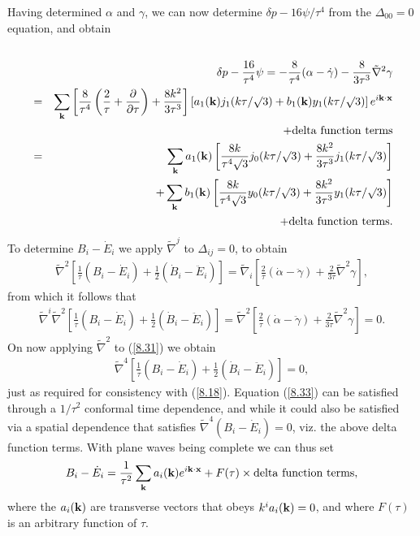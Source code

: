 Having determined $\alpha$ and $\gamma$, we can now determine $\delta p-16\psi/\tau^4$ from the $\Delta_{00}=0$ equation, and obtain
%
\begin{eqnarray}
\nonumber\\
&&\delta p -\frac{16}{\tau^4}\psi=-\frac{8}{\tau^4}(\alpha-\dot{\gamma})-\frac{8}{3\tau^3}\tilde{\nabla}^2\gamma
\nonumber\\
&=&\sum_{\bf k}\left[\frac{8}{\tau^4}\left(\frac{2}{\tau}+\frac{\partial}{\partial \tau}\right)
+\frac{8k^2}{3\tau^3}\right]\left[a_1({\bf k})j_1(k\tau/\surd{3})+b_1({\bf k})y_1(k\tau/\surd{3})\right]e^{i{\bf k}\cdot{\bf x}}
\nonumber\\
&& + {\rm delta~function~terms}
\nonumber\\
&=&\sum_{\bf k}a_1({\bf k})\left[\frac{8k}{\tau^4\surd{3}}j_0(k\tau/\surd{3})+\frac{8k^2}{3\tau^3}j_1(k\tau/\surd{3})\right]
\nonumber\\
&&+\sum_{\bf k}b_1({\bf k})\left[\frac{8k}{\tau^4\surd{3}}y_0(k\tau/\surd{3})+\frac{8k^2}{3\tau^3}y_1(k\tau/\surd{3})\right]
\nonumber\\
&&+ {\rm delta~function~terms}.
\label{8.30}
\end{eqnarray}
%
To determine $B_i-\dot{E}_i$ we apply $\tilde{\nabla}^j$ to $\Delta_{ij}=0$, to obtain
%
\begin{eqnarray}
\tilde{\nabla}^2\left[\frac{1}{\tau}(B_i-\dot{E}_i)+\frac{1}{2}(\dot{B}_i-\ddot{E}_i)\right]=\tilde{\nabla}_i\left[\frac{2}{\tau}(\dot{\alpha}-\ddot{\gamma})+\frac{2}{3\tau}\tilde{\nabla}^2\gamma\right],
\label{8.31}
\end{eqnarray}
%
from which it follows that
%
\begin{eqnarray}
\tilde{\nabla}^i\tilde{\nabla}^2\left[\frac{1}{\tau}(B_i-\dot{E}_i)+\frac{1}{2}(\dot{B}_i-\ddot{E}_i)\right]=\tilde{\nabla}^2\left[\frac{2}{\tau}(\dot{\alpha}-\ddot{\gamma})+\frac{2}{3\tau}\tilde{\nabla}^2\gamma\right]=0.
\label{8.32}
\end{eqnarray}
%
On now applying $\tilde{\nabla}^2$ to (\ref{8.31}) we  obtain
%
\begin{eqnarray}
\tilde{\nabla}^4\left[\frac{1}{\tau}(B_i-\dot{E}_i)+\frac{1}{2}(\dot{B}_i-\ddot{E}_i)\right]=0,
\label{8.33}
\end{eqnarray}
%
just as required for consistency with (\ref{8.18}).
Equation (\ref{8.33}) can be satisfied through a $1/\tau^2$ conformal time dependence, and while it could also be satisfied via a spatial dependence that satisfies $\tilde{\nabla}^4(B_i-\dot{E}_i)=0$, viz. the above delta function terms. With plane waves being complete we can thus set
%
\begin{eqnarray}
B_i-\dot{E}_i=\frac{1}{\tau^2}\sum_{\bf k}a_i({\bf k})e^{i{\bf k}\cdot{\bf x}}
+F(\tau)\times {\rm delta~function~terms},
\label{8.34}
\end{eqnarray}
%
where the $a_i({\bf k})$ are transverse vectors that obeys $k^ia_i({\bf k})=0$, and where $F(\tau)$ is an arbitrary function of $\tau$.


